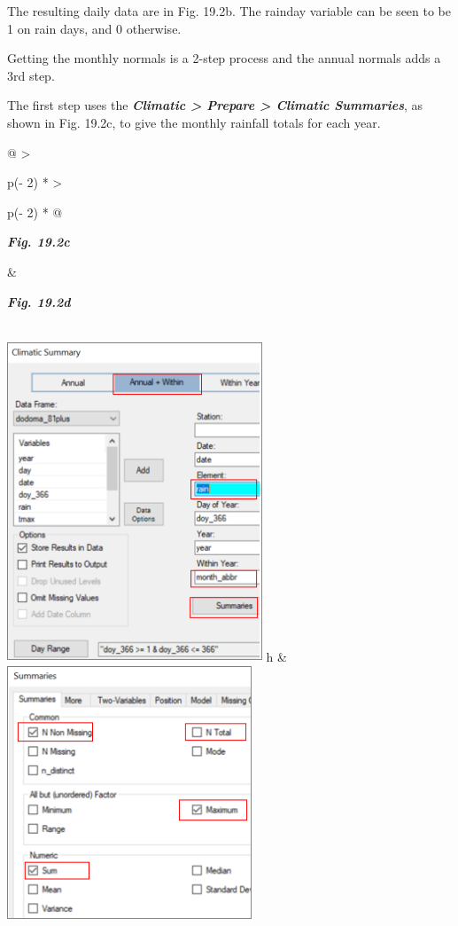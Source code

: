 \documentclass[
  letterpaper,
  DIV=11,
  numbers=noendperiod]{scrreprt}
\begin{document}
The resulting daily data are in Fig. 19.2b. The rainday variable can be
seen to be 1 on rain days, and 0 otherwise.

Getting the monthly normals is a 2-step process and the annual normals
adds a 3rd step.

The first step uses the \textbf{\emph{Climatic \textgreater{} Prepare
\textgreater{} Climatic Summaries}}, as shown in Fig. 19.2c, to give the
monthly rainfall totals for each year.

\begin{longtable}[]{@{}
  >{\raggedright\arraybackslash}p{(\columnwidth - 2\tabcolsep) * }
  >{\raggedright\arraybackslash}p{(\columnwidth - 2\tabcolsep) * }@{}}
\toprule\noalign{}
\begin{minipage}[b]{\linewidth}\raggedright
\textbf{\emph{Fig. 19.2c}}
\end{minipage} & \begin{minipage}[b]{\linewidth}\raggedright
\textbf{\emph{Fig. 19.2d}}
\end{minipage} \\
\midrule\noalign{}
\endhead
\bottomrule\noalign{}
\endlastfoot
\includegraphics[width=2.9982in,height=3.77487in]{figures/Fig19.2c.png}
h &
\includegraphics[width=2.87745in,height=\textheight]{figures/Fig19.2d.png} \\
\end{longtable}
\end{document}
